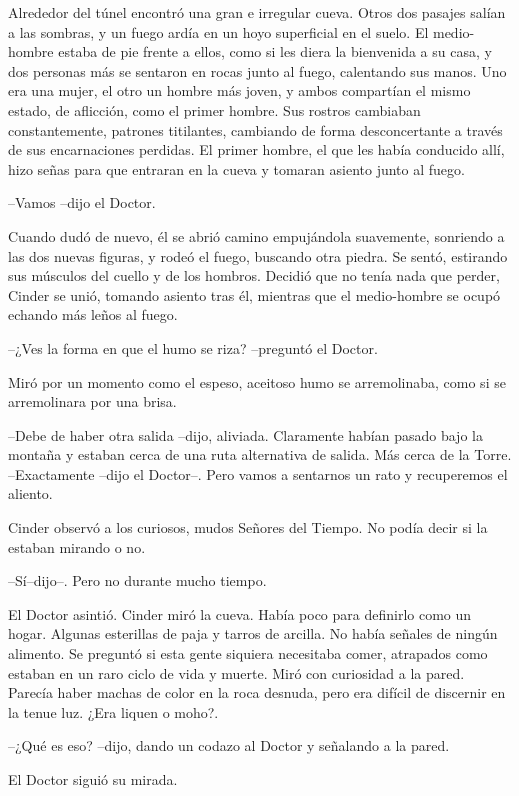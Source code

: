 Alrededor del túnel encontró una gran e irregular cueva. Otros dos pasajes salían a las sombras, y un fuego ardía en un hoyo superficial en el suelo. El medio-hombre estaba de pie frente a ellos, como si les diera la bienvenida a su casa, y dos personas más se sentaron en rocas junto al fuego, calentando sus manos. Uno era una mujer, el otro un hombre más joven, y ambos compartían el mismo estado, de aflicción, como el primer hombre. Sus rostros cambiaban constantemente, patrones titilantes, cambiando de forma desconcertante a través de sus encarnaciones perdidas.
El primer hombre, el que les había conducido allí, hizo señas para que entraran en la cueva y tomaran asiento junto al fuego.

--Vamos --dijo el Doctor. 

Cuando dudó de nuevo, él se abrió camino empujándola suavemente, sonriendo a las dos nuevas figuras, y rodeó el fuego, buscando otra piedra. Se sentó, estirando sus músculos del cuello y de los hombros.
Decidió que no tenía nada que perder, Cinder se unió, tomando asiento tras él, mientras que el medio-hombre se ocupó echando más leños al fuego.

--¿Ves la forma en que el humo se riza? --preguntó el Doctor.

Miró por un momento como el espeso, aceitoso humo se arremolinaba, como si se arremolinara por una brisa. 

--Debe de haber otra salida --dijo, aliviada. Claramente habían pasado bajo la montaña y estaban cerca de una ruta alternativa de salida. Más cerca de la Torre.
--Exactamente --dijo el Doctor--. Pero vamos a sentarnos un rato y recuperemos el aliento.

Cinder observó a los curiosos, mudos Señores del Tiempo. No podía decir si la estaban mirando o no. 

--Sí--dijo--. Pero no durante mucho tiempo.

El Doctor asintió.
Cinder miró la cueva. Había poco para definirlo como un hogar. Algunas esterillas de paja y tarros de arcilla. No había señales de ningún alimento. Se preguntó si esta gente siquiera necesitaba comer, atrapados como estaban en un raro ciclo de vida y muerte.
Miró con curiosidad a la pared. Parecía haber machas de color en la roca desnuda, pero era difícil de discernir en la tenue luz. ¿Era liquen o moho?.

--¿Qué es eso? --dijo, dando un codazo al Doctor y señalando a la pared.

El Doctor siguió su mirada. 

